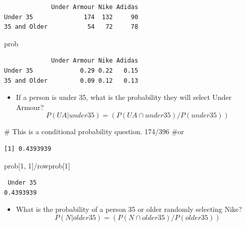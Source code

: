 \documentclass[
  letterpaper,
  DIV=11,
  numbers=noendperiod]{scrreprt}
\newenvironment{Shaded}{\begin{snugshade}}{\end{snugshade}}
\newcommand{\CommentTok}[1]{\textcolor[rgb]{0.37,0.37,0.37}{#1}}
\newcommand{\DecValTok}[1]{\textcolor[rgb]{0.68,0.00,0.00}{#1}}
\newcommand{\NormalTok}[1]{\textcolor[rgb]{0.00,0.23,0.31}{#1}}
\newcommand{\SpecialCharTok}[1]{\textcolor[rgb]{0.37,0.37,0.37}{#1}}
\providecommand{\tightlist}{%
  \setlength{\itemsep}{0pt}\setlength{\parskip}{0pt}}\usepackage{longtable,booktabs,array}
\begin{document}
\begin{verbatim}
             Under Armour Nike Adidas
Under 35              174  132     90
35 and Older           54   72     78
\end{verbatim}

\begin{Shaded}
\begin{Highlighting}[]
\NormalTok{prob}
\end{Highlighting}
\end{Shaded}

\begin{verbatim}
             Under Armour Nike Adidas
Under 35             0.29 0.22   0.15
35 and Older         0.09 0.12   0.13
\end{verbatim}

\begin{itemize}
\tightlist
\item
  If a person is under 35, what is the probability they will select
  Under Armour? \[P(UA|under35) = (P(UA \cap under35)/P(under35))\]
\end{itemize}

\begin{Shaded}
\begin{Highlighting}[]
\CommentTok{\# This is a conditional probability question.}
\DecValTok{174}\SpecialCharTok{/}\DecValTok{396}  \CommentTok{\#or}
\end{Highlighting}
\end{Shaded}

\begin{verbatim}
[1] 0.4393939
\end{verbatim}

\begin{Shaded}
\begin{Highlighting}[]
\NormalTok{prob[}\DecValTok{1}\NormalTok{, }\DecValTok{1}\NormalTok{]}\SpecialCharTok{/}\NormalTok{rowprob[}\DecValTok{1}\NormalTok{]}
\end{Highlighting}
\end{Shaded}

\begin{verbatim}
 Under 35 
0.4393939 
\end{verbatim}

\begin{itemize}
\tightlist
\item
  What is the probability of a person 35 or older randomly selecting
  Nike? \[P(N|older35) = (P(N \cap older35)/P(older35))\]
\end{itemize}
\end{document}
